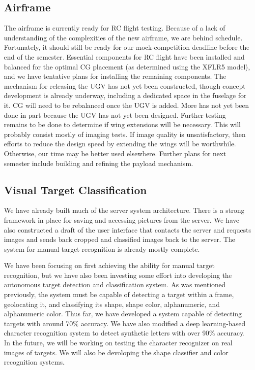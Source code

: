 \documentclass[]{auvsi_doc}
\begin{document}
\subsection{Airframe}
The airframe is currently ready for RC flight testing. Because of a lack of understanding of the complexities of the new airframe, we are behind schedule. Fortunately, it should still be ready for our mock-competition deadline before the end of the semester. Essential components for RC flight have been installed and balanced for the optimal CG placement (as determined using the XFLR5 model), and we have tentative plans for installing the remaining components. The mechanism for releasing the UGV has not yet been constructed, though concept development is already underway, including a dedicated space in the fuselage for it. CG will need to be rebalanced once the UGV is added. More has not yet been done in part because the UGV has not yet been designed. Further testing remains to be done to determine if wing extensions will be necessary. This will probably consist mostly of imaging tests. If image quality is unsatisfactory, then efforts to reduce the design speed by extending the wings will be worthwhile. Otherwise, our time may be better used elsewhere. Further plans for next semester include building and refining the payload mechanism.
\subsection{Visual Target Classification}
We have already built much of the server system architecture. There is a strong framework in place for saving and accessing pictures
from the server. We have also constructed a draft of the user interface that contacts the server and requests images and sends back
cropped and classified images back to the server. The system for manual target recognition is already mostly complete.

We have been focusing on first achieving the ability for manual target recognition, but we have also been investing some effort into developing
the autonomous target detection and classification system. As was mentioned previously, the system must be capable of detecting a target
within a frame, geolocating it, and classifying its shape, shape color, alphanumeric, and alphanumeric color. Thus far, we have developed a
system capable of detecting targets with around 70\% accuracy. We have also modified a deep learning-based character recognition system
to detect synthetic letters with over 90\% accuracy. In the future, we will be working on testing the character recognizer on
real images of targets. We will also be devoloping the shape classifier and color recognition systems.
\end{document}
